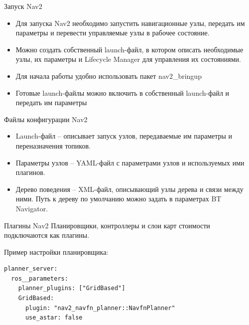 \documentclass[aspectratio=169]{beamer}
\newcommand{\term}[1]{{\textcolor{HSEblue}{#1}}}
\begin{document}
\begin{frame}{Запуск Nav2}

  \begin{itemize}
    \item Для запуска Nav2 необходимо запустить навигационные
          узлы, передать им параметры и перевести управляемые
          узлы в рабочее состояние.
    \item Можно создать собственный launch-файл,
          в котором описать необходимые узлы, их параметры
          и Lifecycle Manager для управления их состояниями.
    \item Для начала работы удобно использовать пакет
          \term{nav2\_bringup}
    \item Готовые launch-файлы можно включить в собственный
          launch-файл и передать им параметры
  \end{itemize}

\end{frame}

\begin{frame}{Файлы конфигурации Nav2}
  \begin{itemize}
    \item \term{Launch-файл} -- описывает запуск узлов,
          передаваемые им параметры и переназначения топиков.

    \item \term{Параметры узлов} -- YAML-файл с параметрами
          узлов и используемых ими плагинов.

    \item \term{Дерево поведения} -- XML-файл, описывающий
          узлы дерева и связи между ними. Путь к дереву
          по умолчанию можно задать в параметрах BT Navigator.
  \end{itemize}
\end{frame}

\begin{frame}[fragile]{Плагины Nav2}
Планировщики, контроллеры и слои карт стоимости подключаются как плагины.
\begin{block}{Пример настройки планировщика:}
\begin{lstlisting}[numbers=none]
planner_server:
  ros__parameters:
    planner_plugins: ["GridBased"]
    GridBased:
      plugin: "nav2_navfn_planner::NavfnPlanner"
      use_astar: false
\end{lstlisting}
\end{block}
\end{frame}
\end{document}
